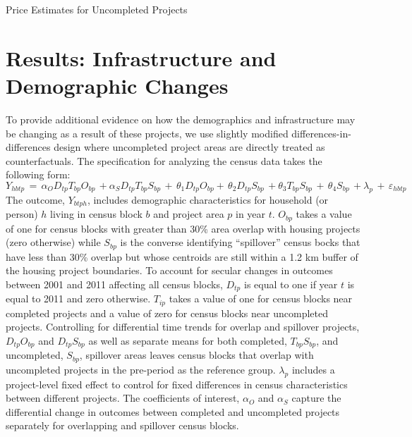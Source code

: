 \documentclass[12pt]{article}
\begin{document}
\begin{table}
\caption{Price Estimates for Uncompleted Projects}\label{table:priceestplacebo}
\centering

\end{table}


\section{Results: Infrastructure and Demographic Changes}

To provide additional evidence on how the demographics and infrastructure may be changing as a result of these projects, we use slightly modified differences-in-differences design where uncompleted project areas are directly treated as counterfactuals.  The specification for analyzing the census data takes the following form:
\begin{equation*}
Y_{hbtp} \, = \, \alpha_{O} D_{tp} T_{bp} O_{bp} \, + \alpha_{S} D_{tp} T_{bp} S_{bp} \, + \,\theta_1 D_{tp} O_{bp} + \,\theta_2 D_{tp} S_{bp} \, + \theta_3 T_{bp} S_{bp}  \, +  \, \theta_4 S_{bp} \, +  \lambda_p \, + \, \varepsilon_{hbtp}
\end{equation*}
The outcome, $Y_{btph}$, includes demographic characteristics for household (or person) $h$ living in census block $b$ and project area $p$ in year $t$.  $O_{bp}$ takes a value of one for census blocks with greater than 30\% area overlap with housing projects (zero otherwise) while $S_{bp}$ is the converse identifying ``spillover'' census bocks that have less than 30\% overlap but whose centroids are still within a 1.2 km buffer of the housing project boundaries.  To account for secular changes in outcomes between 2001 and 2011 affecting all census blocks, $D_{tp}$ is equal to one if year $t$ is equal to 2011 and zero otherwise.  $T_{ip}$ takes a value of one for census blocks near completed projects and a value of zero for census blocks near uncompleted projects.  Controlling for differential time trends for overlap and spillover projects, $D_{tp} O_{bp} $ and $D_{tp} S_{bp}$ as well as separate means for both completed, $T_{bp} S_{bp}$, and uncompleted, $S_{bp}$, spillover areas leaves census blocks that overlap with uncompleted projects in the pre-period as the reference group.  $\lambda_p$ includes a project-level fixed effect to control for fixed differences in census characteristics between different projects.  The coefficients of interest, $\alpha_O$ and $\alpha_{S}$ capture the differential change in outcomes between completed and uncompleted projects separately for overlapping and spillover census blocks.  
\end{document}
